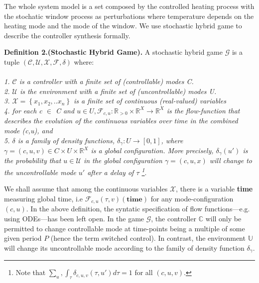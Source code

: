     The whole system model is a set composed by the controlled heating 
    process with the stochatic window process as perturbations where 
    temperature depends on the heating mode and the mode of the window. 
    We use stochastic hybrid game to describe the controller synthesis formally.

    \textbf{Definition 2.(Stochastic Hybrid Game).} A stochastic hybrid game $\mathcal{G}$ is a
    tuple $(\mathcal{C,U,X,F},\delta)$ where:
    \\
    \\
    \emph{1. $\mathcal{C}$ is a controller with a finite set of (controllable) modes C.} \\
    \emph{2. $\mathcal{U}$ is the environment with a finite set of (uncontrollable) modes U.} \\
    \emph{3. $\mathcal{X} = \left\lbrace x_1,x_2,..x_ n \right\rbrace$ is a finite set of
    continuous (real-valued) variables } \\
    \emph{4. for each c $\in$ C and $u \in U, \mathcal{F}_{c,u} : \mathbb{R}_{>0}
      \times \mathbb{R}^X \rightarrow\mathbb{R}^X$ 
        is the flow-function that describes the evolution of the continuous variables
        over time in the combined mode (c,u), and} \\
    \emph{5. $\delta$ is a family of density functions, $\delta_\gamma: 
    U \rightarrow 
    [0,1]$, where $ \gamma = (c,u,v) \in C \times U
    \times \mathbb{R}^X$ is a global configuration.
    More precisely, $\delta_{\gamma}(u')$ is the probability that $u \in \mathcal{U}$
    in the global configuration $ \gamma = (c,u,x)$ will change to the
      uncontrollable mode $u'$ after a delay of $\tau$ 
      \footnote{Note that $\sum_u,\int_{\tau}\delta_{c,u,v}(\tau,u')d\tau = 1$ for all $(c,u,v)$.}}.


      
    We shall assume that among the continuous variables $\mathcal{X}$, there is a variable
    \textbf{time} measuring global time, i.e $\mathcal{F}_{c,u}(\tau,v)(\textbf{time})$ 
    for any mode-configuration $(c,u)$. In the above definition, the syntatic specification
    of flow functions---e.g. using ODEs---has been left open. In the game $\mathcal{G}$,
    the controller $\mathbb{C}$ will only be permitted to change controllable mode at time-points
    being a multiple of some given period $P$ (hence the term switched control). In contrast,
    the environment $\mathbb{U}$ will change its uncontrollable mode according to the 
    family of density function $\delta_\gamma$.
    
